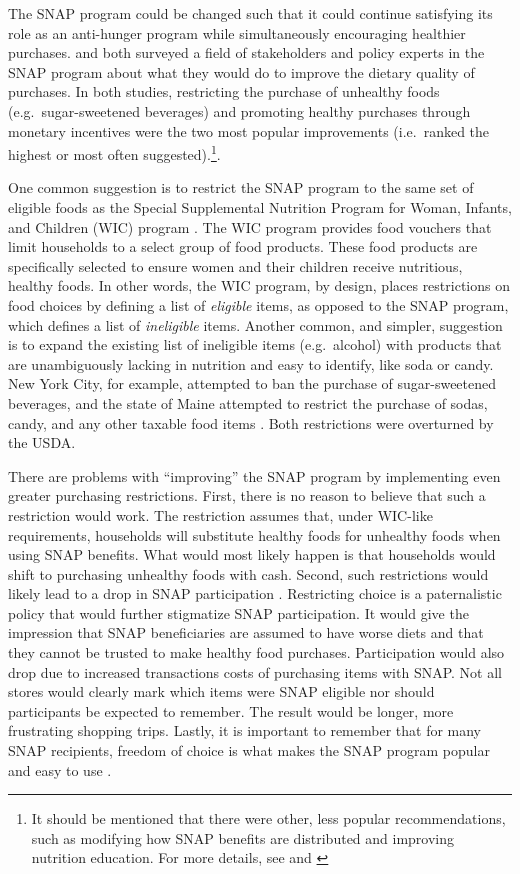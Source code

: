 \documentclass[12pt,letterpaperpaper,]{book}
\begin{document}
The SNAP program could be changed such that it could continue satisfying
its role as an anti-hunger program while simultaneously encouraging
healthier purchases. \citet{blumenthal_strategies_2014} and
\citet{leung_qualitative_2013} both surveyed a field of stakeholders and
policy experts in the SNAP program about what they would do to improve
the dietary quality of purchases. In both studies, restricting the
purchase of unhealthy foods (e.g.~sugar-sweetened beverages) and
promoting healthy purchases through monetary incentives were the two
most popular improvements (i.e.~ranked the highest or most often
suggested).\footnote{It should be mentioned that there were other, less
  popular recommendations, such as modifying how SNAP benefits are
  distributed and improving nutrition education. For more details, see
  \citet{blumenthal_strategies_2014} and \citet{leung_qualitative_2013}}.

One common suggestion is to restrict the SNAP program to the same set of
eligible foods as the Special Supplemental Nutrition Program for Woman,
Infants, and Children (WIC) program \citep{dinour_food_2007}. The WIC
program provides food vouchers that limit households to a select group
of food products. These food products are specifically selected to
ensure women and their children receive nutritious, healthy foods. In
other words, the WIC program, by design, places restrictions on food
choices by defining a list of \emph{eligible} items, as opposed to the
SNAP program, which defines a list of \emph{ineligible} items. Another
common, and simpler, suggestion is to expand the existing list of
ineligible items (e.g.~alcohol) with products that are unambiguously
lacking in nutrition and easy to identify, like soda or candy. New York
City, for example, attempted to ban the purchase of sugar-sweetened
beverages, and the state of Maine attempted to restrict the purchase of
sodas, candy, and any other taxable food items
\citep{gundersen_snap_2015}. Both restrictions were overturned by the
USDA.

There are problems with ``improving'' the SNAP program by implementing
even greater purchasing restrictions. First, there is no reason to
believe that such a restriction would work. The restriction assumes
that, under WIC-like requirements, households will substitute healthy
foods for unhealthy foods when using SNAP benefits. What would most
likely happen is that households would shift to purchasing unhealthy
foods with cash. Second, such restrictions would likely lead to a drop
in SNAP participation \citep{gundersen_snap_2015}. Restricting choice is
a paternalistic policy that would further stigmatize SNAP participation.
It would give the impression that SNAP beneficiaries are assumed to have
worse diets and that they cannot be trusted to make healthy food
purchases. Participation would also drop due to increased transactions
costs of purchasing items with SNAP. Not all stores would clearly mark
which items were SNAP eligible nor should participants be expected to
remember. The result would be longer, more frustrating shopping trips.
Lastly, it is important to remember that for many SNAP recipients,
freedom of choice is what makes the SNAP program popular and easy to use
\citep{edin_snap_2013}.
\end{document}
